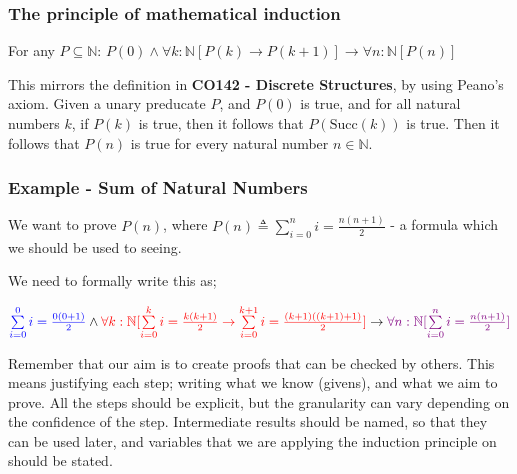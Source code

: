 \documentclass[a4paper, 12pt]{article}
\newcommand{\summation}[3]{\sum\limits_{#1}^{#2} #3}
\begin{document}
            \subsubsection*{The principle of mathematical induction}
                For any $P \subseteq \mathbb{N}$: $P(0) \land \forall k : \mathbb{N}[P(k) \rightarrow P(k + 1)] \rightarrow \forall n : \mathbb{N}[P(n)]$
                \medskip

                This mirrors the definition in \textbf{CO142 - Discrete Structures}, by using Peano's axiom. Given a unary preducate $P$, and $P(0)$ is true, and for all natural numbers $k$, if $P(k)$ is true, then it follows that $P(\text{Succ}(k))$ is true. Then it follows that $P(n)$ is true for every natural number $n \in \mathbb{N}$.
            \subsubsection*{Example - Sum of Natural Numbers}
                We want to prove $P(n)$, where $P(n) \triangleq \summation{i = 0}{n}{i} = \frac{n(n + 1)}{2}$ - a formula which we should be used to seeing.
                \smallskip

                We need to formally write this as;
                \medskip

                $\textcolor{blue}{\summation{i = 0}{0}{i} = \frac{0(0 + 1)}{2}} \land \textcolor{red}{\forall k : \mathbb{N} [\summation{i = 0}{k}{i} = \frac{k(k + 1)}{2} \rightarrow \summation{i = 0}{k + 1}{i} = \frac{(k + 1)((k + 1) + 1)}{2}]} \rightarrow \textcolor{violet}{\forall n : \mathbb{N} [\summation{i = 0}{n}{i} = \frac{n(n + 1)}{2}]}$
                \bigskip

                Remember that our aim is to create proofs that can be checked by others. This means justifying each step; writing what we know (givens), and what we aim to prove. All the steps should be explicit, but the granularity can vary depending on the confidence of the step. Intermediate results should be named, so that they can be used later, and variables that we are applying the induction principle on should be stated.
\end{document}
